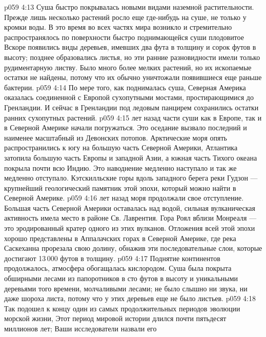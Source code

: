 \vs p059 4:13 Суша быстро покрывалась новыми видами наземной растительности. Прежде лишь несколько растений росло еще где\hyp{}нибудь на суше, не только у кромки воды. В это время во всех частях мира  возникло и стремительно распространялось по поверхности быстро поднимающейся суши плодовитое  Вскоре появились виды деревьев, имевших два фута в толщину и сорок футов в высоту; позднее образовались листья, но эти ранние разновидности имели только рудиментарную листву. Было много более мелких растений, но их ископаемые остатки не найдены, потому что их обычно уничтожали появившиеся еще раньше бактерии.
\vs p059 4:14 По мере того, как поднималась суша, Северная Америка оказалась соединенной с Европой сухопутными мостами, простирающимися до Гренландии. И сейчас в Гренландии под ледовым панцирем сохранились остатки ранних сухопутных растений.
\vs p059 4:15 \pc {} лет назад части суши как в Европе, так и в Северной Америке начали погружаться. Это оседание вызвало последний и наименее масштабный из Девонских потопов. Арктические моря опять распространились к югу на большую часть Северной Америки, Атлантика затопила большую часть Европы и западной Азии, а южная часть Тихого океана покрыла почти всю Индию. Это наводнение медленно наступало и так же медленно отступало. Кэтскилльские горы вдоль западного берега реки Гудзон --- крупнейший геологический памятник этой эпохи, который можно найти в Северной Америке.
\vs p059 4:16 \pc {} лет назад моря продолжали свое отступление. Большая часть Северной Америки оставалась над водой, сильная вулканическая активность имела место в районе Св. Лаврентия. Гора Роял вблизи Монреаля --- это эродированный кратер одного из этих вулканов. Отложения всей этой эпохи хорошо представлены в Аппалачских горах в Северной Америке, где река Саскеханна прорезала свою долину, обнажив эти последовательные слои, которые достигают 13\,000 футов в толщину.
\vs p059 4:17 \pc Поднятие континентов продолжалось, атмосфера обогащалась кислородом. Суша была покрыта обширными лесами из папоротников в сто футов в высоту и уникальными деревьями того времени, молчаливыми лесами; не было слышно ни звука, ни даже шороха листа, потому что у этих деревьев еще не было листьев.
\vs p059 4:18 \pc Так подошел к концу один из самых продолжительных периодов эволюции морской жизни,  Этот период мировой истории длился почти пятьдесят миллионов лет; Ваши исследователи назвали его 
